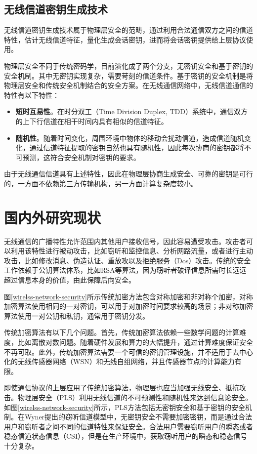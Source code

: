 \documentclass[master]{seuthesis} %
\begin{document}
\begin{Main}
\subsection{无线信道密钥生成技术}

无线信道密钥生成技术属于物理层安全的范畴，通过利用合法通信双方之间的信道特性，估计无线信道特征，量化生成会话密钥，进而将会话密钥提供给上层协议使用。

物理层安全不同于传统密码学，目前演化成了两个分支，无密钥安全和基于密钥的安全机制。其中无密钥实现复杂，需要苛刻的信道条件。基于密钥的安全机制是将物理层安全和传统安全机制结合的安全方案。在无线通信网络中，无线信道通信的特性有以下特性：

\begin{itemize}
    \item \textbf{短时互易性}。在时分双工（Time Division Duplex, TDD）系统中，通信双方的上下行信道在相干时间内具有相似的信道特征。
    \item \textbf{随机性}。随着时间变化，周围环境中物体的移动会扰动信道，造成信道随机变化，通过信道特征提取的密钥自然也具有随机性，因此每次协商的密钥都将不可预测，这符合安全机制对密钥的要求。
\end{itemize}

由于无线通信信道具有上述特性，因此在物理层协商生成安全、可靠的密钥是可行的，一方面不依赖第三方传输机构，另一方面计算复杂度较小。

\section{国内外研究现状}

无线通信的广播特性允许范围内其他用户接收信号，因此容易遭受攻击。攻击者可以利用该特性进行被动攻击，比如窃听和监控信息、分析网路流量，或者进行主动攻击，比如修改消息、伪造认证、重放攻以及拒绝服务（Dos）攻击\cite{Zhang2016Key}。传统的安全工作依赖于公钥算法体系，比如RSA等算法，因为窃听者破译信息所需时长远远超过信息本身的价值，由此保障后向安全。

图\ref{wirelss-network-security}所示传统加密方法包含对称加密和非对称个加密，对称加密算法使用相同的一对密钥，可以用于对加密时间要求较高的场景；非对称加密算法使用一对公钥和私钥，通常用于密钥分发。

传统加密算法有以下几个问题。首先，传统加密算法依赖一些数学问题的计算难度，比如离散对数问题。随着硬件发展和算力的大幅提升，通过计算难度保证安全不再可取。此外，传统加密算法需要一个可信的密钥管理设施，并不适用于去中心化的无线传感器网络（WSN）和无线自组网络，并且传感器节点的计算能力有限。

即使通信协议的上层应用了传统加密算法，物理层也应当加强无线安全、抵抗攻击。物理层安全（PLS）利用无线信道的不可预测性和随机性来达到信息论安全。如图\ref{wirelss-network-security}所示，PLS方法包括无密钥安全和基于密钥的安全机制。在Wyner提出的窃听信道模型中，无密钥安全不需要加密密钥，而是通过合法用户和窃听者之间不同的信道特性来保证安全\cite{6739367}。合法用户需要窃听用户的瞬态或者稳态信道状态信息（CSI），但是在生产环境中，获取窃听用户的瞬态和稳态信号十分复杂。


\end{Main}
\end{document}

